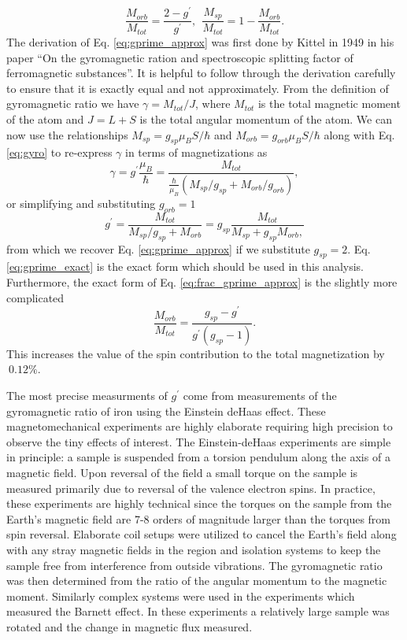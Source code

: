 \documentclass[12pt]{article}
\begin{document}
\begin{equation}
\frac{M_{orb}}{M_{tot}}=\frac{2-g^{\prime}}{g^{\prime}}, ~~\frac{M_{sp}}{M_{tot}}=1-\frac{M_{orb}}{M_{tot}}.
\label{eq:frac_gprime_approx}
\end{equation}
The derivation of Eq. \ref{eq:gprime_approx} was first done by Kittel in 1949 in his paper ``On the gyromagnetic ration and spectroscopic splitting factor of ferromagnetic substances''\cite{Kittel1949}. It is helpful to follow through the derivation carefully to ensure that it is exactly equal and not approximately. From the definition of gyromagnetic ratio we have $\gamma=M_{tot}/J$, where $M_{tot}$ is the total magnetic moment of the atom and $J=L+S$ is the total angular momentum of the atom. We can now use the relationships $M_{sp}=g_{sp}\mu_BS/\hbar$ and $M_{orb}=g_{orb}\mu_BS/\hbar$ along with Eq. \ref{eq:gyro} to re-express $\gamma$ in terms of magnetizations as
\begin{equation}
\gamma=g^{\prime}\frac{\mu_B}{\hbar}=\frac{M_{tot}}{\frac{\hbar}{\mu_B}(M_{sp}/g_{sp}+M_{orb}/g_{orb})},
\end{equation}
or simplifying and substituting $g_{orb}=1$
\begin{equation}
g^{\prime}=\frac{M_{tot}}{M_{sp}/g_{sp}+M_{orb}}=g_{sp}\frac{M_{tot}}{M_{sp}+g_{sp}M_{orb},}
\label{eq:gprime_exact}
\end{equation}
from which we recover Eq. \ref{eq:gprime_approx} if we substitute $g_{sp}=2$. Eq. \ref{eq:gprime_exact} is the exact form which should be used in this analysis. Furthermore, the exact form of Eq. \ref{eq:frac_gprime_approx} is the slightly more complicated
\begin{equation}
\frac{M_{orb}}{M_{tot}}=\frac{g_{sp}-g^{\prime}}{g^{\prime}(g_{sp}-1)}.
\label{eq:frac_gprime_exact}
\end{equation}
This increases the value of the spin contribution to the total magnetization by $~0.12\%$.

The most precise measurments of $g^{\prime}$ come from measurements of the gyromagnetic ratio of iron using the Einstein deHaas effect. These magnetomechanical experiments are highly elaborate requiring high precision to observe the tiny effects of interest. The Einstein-deHaas experiments are simple in principle: a sample is suspended from a torsion pendulum along the axis of a magnetic field. Upon reversal of the field a small torque on the sample is measured primarily due to reversal of the valence electron spins. In practice, these experiments are highly technical since the torques on the sample from the Earth's magnetic field are 7-8 orders of magnitude larger than the torques from spin reversal. Elaborate coil setups were utilized to cancel the Earth's field along with any stray magnetic fields in the region and isolation systems to keep the sample free from interference from outside vibrations. The gyromagnetic ratio was then determined from the ratio of the angular momentum to the magnetic moment. Similarly complex systems were used in the experiments which measured the Barnett effect. In these experiments a relatively large sample was rotated and the change in magnetic flux measured. 
\end{document}

